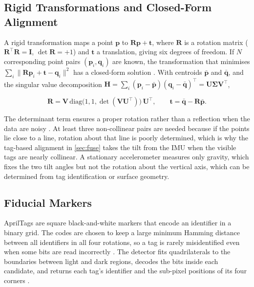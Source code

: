 \subsection{Rigid Transformations and Closed-Form Alignment}
\label{sec:theory_rigid}
A rigid transformation maps a point $\mathbf{p}$ to $\mathbf{R}\mathbf{p}+\mathbf{t}$, where $\mathbf{R}$ is a rotation matrix ($\mathbf{R}^\top\mathbf{R}=\mathbf{I}$, $\det\mathbf{R}=+1$) and $\mathbf{t}$ a translation, giving six degrees of freedom. If $N$ corresponding point pairs $(\mathbf{p}_i,\mathbf{q}_i)$ are known, the transformation that minimises $\sum_i\lVert\mathbf{R}\mathbf{p}_i+\mathbf{t}-\mathbf{q}_i\rVert^2$ has a closed-form solution \cite{arunLeastSquaresFittingTwo1987,umeyamaLeastsquaresEstimationTransformation1991}. With centroids $\bar{\mathbf{p}}$ and $\bar{\mathbf{q}}$, and the singular value decomposition $\mathbf{H}=\sum_i(\mathbf{p}_i-\bar{\mathbf{p}})(\mathbf{q}_i-\bar{\mathbf{q}})^\top=\mathbf{U}\boldsymbol{\Sigma}\mathbf{V}^\top$,

\begin{equation}
\mathbf{R}=\mathbf{V}\,\mathrm{diag}\bigl(1,1,\det(\mathbf{V}\mathbf{U}^\top)\bigr)\,\mathbf{U}^\top,\qquad
\mathbf{t}=\bar{\mathbf{q}}-\mathbf{R}\bar{\mathbf{p}} .
\label{eq:svd}
\end{equation}

The determinant term ensures a proper rotation rather than a reflection when the data are noisy \cite{umeyamaLeastsquaresEstimationTransformation1991}. At least three non-collinear pairs are needed because if the points lie close to a line, rotation about that line is poorly determined, which is why the tag-based alignment in \autoref{sec:fuse} takes the tilt from the IMU when the visible tags are nearly collinear. A stationary accelerometer measures only gravity, which fixes the two tilt angles but not the rotation about the vertical axis, which can be determined from tag identification or surface geometry.

\subsection{Fiducial Markers}
\label{sec:theory_apriltag}
AprilTags are square black-and-white markers that encode an identifier in a binary grid. The codes are chosen to keep a large minimum Hamming distance between all identifiers in all four rotations, so a tag is rarely misidentified even when some bits are read incorrectly \cite{olsonAprilTagRobustFlexible2011}. The detector fits quadrilaterals to the boundaries between light and dark regions, decodes the bits inside each candidate, and returns each tag's identifier and the sub-pixel positions of its four corners \cite{wangAprilTag2Efficient2016}.

